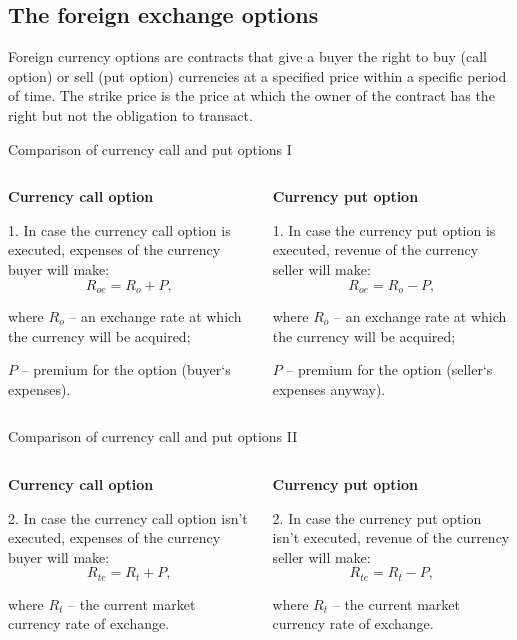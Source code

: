 \documentclass[international_finance_p1.tex]{subfiles}
\begin{document}
\subsection{The foreign exchange options}
\begin{frame}
\begin{block}{Foreign currency options }
\quad are contracts that give a buyer the right to buy (call option) or sell (put option) currencies at a specified price within a specific period of time. The strike price is the price at which the owner of the contract has the right but not the obligation to transact.
\end{block}
\end{frame}
\begin{frame}{Comparison of currency call and put options I}
\begin{columns}
\begin{column}{0.5\textwidth}
\textbf{Currency call option}

1. In case the currency call option is executed, expenses of the currency buyer will make:
$$R_{oe}=R_o+P,$$

where $R_o$ – an exchange rate at which the currency will be acquired;

$P$ – premium for the option (buyer`s expenses).

\end{column}
\begin{column}{0.5\textwidth}  %
\textbf{Currency put option}

1. In case the currency put option is executed, revenue of the currency seller will make:
$$R_{oe}=R_o-P,$$

where $R_o$ – an exchange rate at which the currency will be acquired;

$P$ – premium for the option (seller`s expenses anyway).
\end{column}
\end{columns}
\end{frame}

\begin{frame}{Comparison of currency call and put options II}
\begin{columns}
\begin{column}{0.5\textwidth}
\textbf{Currency call option}

2. In case the currency call option isn't executed, expenses of the currency buyer will make:
$$R_{te}=R_t+P,$$

where $R_t$ – the current market currency rate of exchange.
\end{column}
\begin{column}{0.5\textwidth}  %
\textbf{Currency put option}

2. In case the currency put option isn't executed, revenue of the currency seller will make:
$$R_{te}=R_t-P,$$

where $R_t$ – the current market currency rate of exchange.
\end{column}
\end{columns}
\end{frame}
\end{document}
